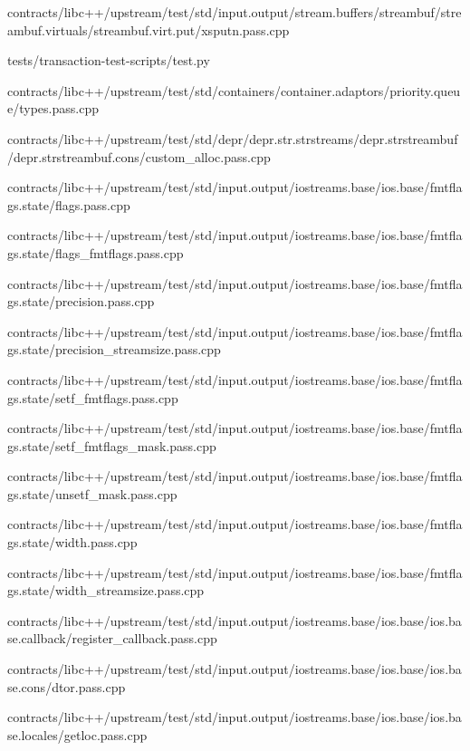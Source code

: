 \begin{DoxyCompactItemize}
contracts/libc++/upstream/test/std/input.\+output/stream.\+buffers/streambuf/streambuf.\+virtuals/streambuf.\+virt.\+put/xsputn.\+pass.\+cpp\item 
tests/transaction-\/test-\/scripts/test.\+py\item 
contracts/libc++/upstream/test/std/containers/container.\+adaptors/priority.\+queue/types.\+pass.\+cpp\item 
contracts/libc++/upstream/test/std/depr/depr.\+str.\+strstreams/depr.\+strstreambuf/depr.\+strstreambuf.\+cons/custom\+\_\+alloc.\+pass.\+cpp\item 
contracts/libc++/upstream/test/std/input.\+output/iostreams.\+base/ios.\+base/fmtflags.\+state/flags.\+pass.\+cpp\item 
contracts/libc++/upstream/test/std/input.\+output/iostreams.\+base/ios.\+base/fmtflags.\+state/flags\+\_\+fmtflags.\+pass.\+cpp\item 
contracts/libc++/upstream/test/std/input.\+output/iostreams.\+base/ios.\+base/fmtflags.\+state/precision.\+pass.\+cpp\item 
contracts/libc++/upstream/test/std/input.\+output/iostreams.\+base/ios.\+base/fmtflags.\+state/precision\+\_\+streamsize.\+pass.\+cpp\item 
contracts/libc++/upstream/test/std/input.\+output/iostreams.\+base/ios.\+base/fmtflags.\+state/setf\+\_\+fmtflags.\+pass.\+cpp\item 
contracts/libc++/upstream/test/std/input.\+output/iostreams.\+base/ios.\+base/fmtflags.\+state/setf\+\_\+fmtflags\+\_\+mask.\+pass.\+cpp\item 
contracts/libc++/upstream/test/std/input.\+output/iostreams.\+base/ios.\+base/fmtflags.\+state/unsetf\+\_\+mask.\+pass.\+cpp\item 
contracts/libc++/upstream/test/std/input.\+output/iostreams.\+base/ios.\+base/fmtflags.\+state/width.\+pass.\+cpp\item 
contracts/libc++/upstream/test/std/input.\+output/iostreams.\+base/ios.\+base/fmtflags.\+state/width\+\_\+streamsize.\+pass.\+cpp\item 
contracts/libc++/upstream/test/std/input.\+output/iostreams.\+base/ios.\+base/ios.\+base.\+callback/register\+\_\+callback.\+pass.\+cpp\item 
contracts/libc++/upstream/test/std/input.\+output/iostreams.\+base/ios.\+base/ios.\+base.\+cons/dtor.\+pass.\+cpp\item 
contracts/libc++/upstream/test/std/input.\+output/iostreams.\+base/ios.\+base/ios.\+base.\+locales/getloc.\+pass.\+cpp\item 

\end{DoxyCompactItemize}
